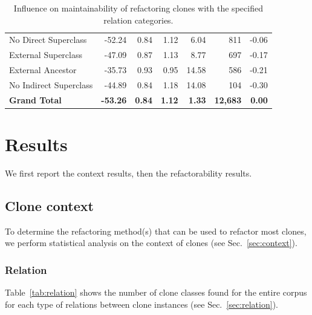 \documentclass[sigconf,review,anonymous]{acmart}
\begin{document}
\begin{table}
{\begin{tabular}{@{}lrrrrrr@{}}
\hspace{10pt} No Direct Superclass & -52.24 & 0.84 & 1.12 & 6.04 & 811 & -0.06 \\
\hspace{10pt} External Superclass & -47.09 & 0.87 & 1.13 & 8.77 & 697 & -0.17 \\
\hspace{10pt} External Ancestor & -35.73 & 0.93 & 0.95 & 14.58 & 586 & -0.21 \\
\hspace{10pt} No Indirect Superclass & -44.89 & 0.84 & 1.18 & 14.08 & 104 & -0.30 \\ \midrule
\textbf{Grand Total} & \textbf{-53.26} & \textbf{0.84} & \textbf{1.12} & \textbf{1.33} & \textbf{12,683} & \textbf{0.00} \\ \bottomrule
\end{tabular}%
}
\caption{Influence on maintainability of refactoring clones with the specified relation categories.}
\label{tab:relation_refactor}
\end{table}


\section{Results} \label{sec:results}
We first report the context results, then the refactorability results.

\subsection{Clone context}
To determine the refactoring method(s) that can be used to refactor most clones, we perform statistical analysis on the context of clones (see Sec.~\ref{sec:context}).

\subsubsection{Relation}
Table~\ref{tab:relation} shows the number of clone classes found for the entire corpus for each type of relations between clone instances (see Sec.~\ref{sec:relation}).
\end{document}
